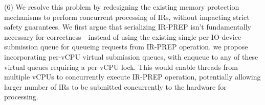 


(6) We resolve this problem by redesigning the existing memory protection mechanisms to perform concurrent processing of IRs, without impacting strict safety guarantees. We first argue that serializing IR-PREP isn't fundamentally necessary for correctness---instead of using the existing single per-IO-device submission queue for queueing requests from IR-PREP operation, we propose incorporating per-vCPU virtual submission queues, with enqueue to any of these virtual queues requiring a per-vCPU lock. This would enable threads from multiple vCPUs to concurrently execute IR-PREP operation, potentially allowing larger number of IRs to be submitted concurrently to the hardware for processing. 

